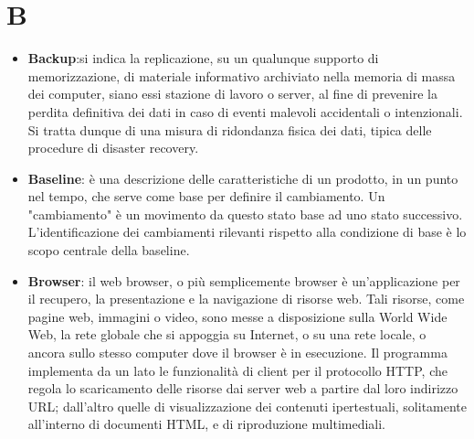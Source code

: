 \section{B}
\begin{itemize} 
	\item
	\textbf{Backup}:si indica la replicazione, su un qualunque supporto di memorizzazione, di materiale informativo archiviato nella memoria di massa dei computer, siano essi stazione di lavoro o server, al fine di prevenire la perdita definitiva dei dati in caso di eventi malevoli accidentali o intenzionali. Si tratta dunque di una misura di ridondanza fisica dei dati, tipica delle procedure di disaster recovery.
	\item
	\textbf{Baseline}: è una descrizione delle caratteristiche di un prodotto, in un punto nel tempo, che serve come base per definire il cambiamento. Un "cambiamento" è un movimento da questo stato base ad uno stato successivo. L'identificazione dei cambiamenti rilevanti rispetto alla condizione di base è lo scopo centrale della baseline.
	\item
	\textbf{Browser}: il web browser, o più semplicemente browser è un'applicazione per il recupero, la presentazione e la navigazione di risorse web. Tali risorse, come pagine web, immagini o video, sono messe a disposizione sulla World Wide Web, la rete globale che si appoggia su Internet, o su una rete locale, o ancora sullo stesso computer dove il browser è in esecuzione. Il programma implementa da un lato le funzionalità di client per il protocollo HTTP, che regola lo scaricamento delle risorse dai server web a partire dal loro indirizzo URL; dall'altro quelle di visualizzazione dei contenuti ipertestuali, solitamente all'interno di documenti HTML, e di riproduzione multimediali.
\end{itemize}